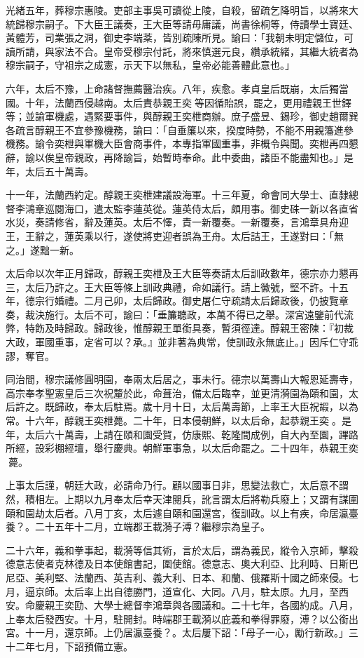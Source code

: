 \begin{pinyinscope}
光緒五年，葬穆宗惠陵。吏部主事吳可讀從上陵，自殺，留疏乞降明旨，以將來大統歸穆宗嗣子。下大臣王議奏，王大臣等請毋庸議，尚書徐桐等，侍讀學士寶廷、黃體芳，司業張之洞，御史李端棻，皆別疏陳所見。諭曰：「我朝未明定儲位，可讀所請，與家法不合。皇帝受穆宗付託，將來慎選元良，纘承統緒，其繼大統者為穆宗嗣子，守祖宗之成憲，示天下以無私，皇帝必能善體此意也。」

六年，太后不豫，上命諸督撫薦醫治疾。八年，疾愈。孝貞皇后既崩，太后獨當國。十年，法蘭西侵越南。太后責恭親王奕等因循貽誤，罷之，更用禮親王世鐸等；並諭軍機處，遇緊要事件，與醇親王奕枻商辦。庶子盛昱、錫珍，御史趙爾巽各疏言醇親王不宜參豫機務，諭曰：「自垂簾以來，揆度時勢，不能不用親籓進參機務。諭令奕枻與軍機大臣會商事件，本專指軍國重事，非概令與聞。奕枻再四懇辭，諭以俟皇帝親政，再降諭旨，始暫時奉命。此中委曲，諸臣不能盡知也。」是年，太后五十萬壽。

十一年，法蘭西約定。醇親王奕枻建議設海軍。十三年夏，命會同大學士、直隸總督李鴻章巡閱海口，遣太監李蓮英從。蓮英侍太后，頗用事。御史硃一新以各直省水災，奏請修省，辭及蓮英。太后不懌，責一新覆奏。一新覆奏，言鴻章具舟迎王，王辭之，蓮英乘以行，遂使將吏迎者誤為王舟。太后詰王，王遂對曰：「無之。」遂黜一新。

太后命以次年正月歸政，醇親王奕枻及王大臣等奏請太后訓政數年，德宗亦力懇再三，太后乃許之。王大臣等條上訓政典禮，命如議行。請上徽號，堅不許。十五年，德宗行婚禮。二月己卯，太后歸政。御史屠仁守疏請太后歸政後，仍披覽章奏，裁決施行。太后不可，諭曰：「垂簾聽政，本萬不得已之舉。深宮遠鑒前代流弊，特飭及時歸政。歸政後，惟醇親王單銜具奏，暫須徑達。醇親王密陳：『初裁大政，軍國重事，定省可以？承。』並非著為典常，使訓政永無底止。」因斥仁守乖謬，奪官。

同治間，穆宗議修圓明園，奉兩太后居之，事未行。德宗以萬壽山大報恩延壽寺，高宗奉孝聖憲皇后三次祝釐於此，命葺治，備太后臨幸，並更清漪園為頤和園，太后許之。既歸政，奉太后駐焉。歲十月十日，太后萬壽節，上率王大臣祝嘏，以為常。十六年，醇親王奕枻薨。二十年，日本侵朝鮮，以太后命，起恭親王奕。是年，太后六十萬壽，上請在頤和園受賀，仿康熙、乾隆間成例，自大內至園，蹕路所經，設彩棚經壇，舉行慶典。朝鮮軍事急，以太后命罷之。二十四年，恭親王奕薨。

上事太后謹，朝廷大政，必請命乃行。顧以國事日非，思變法救亡，太后意不謂然，積相左。上期以九月奉太后幸天津閱兵，訛言謂太后將勒兵廢上；又謂有謀圍頤和園劫太后者。八月丁亥，太后遽自頤和園還宮，復訓政。以上有疾，命居瀛臺養？。二十五年十二月，立端郡王載漪子溥？繼穆宗為皇子。

二十六年，義和拳事起，載漪等信其術，言於太后，謂為義民，縱令入京師，擊殺德意志使者克林德及日本使館書記，圍使館。德意志、奧大利亞、比利時、日斯巴尼亞、美利堅、法蘭西、英吉利、義大利、日本、和蘭、俄羅斯十國之師來侵。七月，逼京師。太后率上出自德勝門，道宣化、大同。八月，駐太原。九月，至西安。命慶親王奕劻、大學士總督李鴻章與各國議和。二十七年，各國約成。八月，上奉太后發西安。十月，駐開封。時端郡王載漪以庇義和拳得罪廢，溥？以公銜出宮。十一月，還京師。上仍居瀛臺養？。太后屢下詔：「母子一心，勵行新政。」三十二年七月，下詔預備立憲。


\end{pinyinscope}
